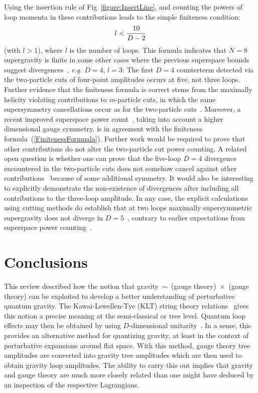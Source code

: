 \documentclass[12pt]{livrev}
\begin{document}
Using the insertion rule of Fig~\ref{figure:InsertLine}, 
and counting the powers of loop momenta in these contributions 
leads to the simple finiteness condition:
%
\begin{equation}
l < {10 \over D-2}
\label{FinitenessFormuala}
\end{equation}
%
(with $l>1$), where $l$ is the number of loops.  This formula
indicates that $N=8$ supergravity is finite in some other cases where
the previous superspace bounds suggest divergences~\cite{Howe89}, {\it
e.g.} $D=4$, $l=3$: The first $D=4$ counterterm detected via the
two-particle cuts of four-point amplitudes occurs at five, not three
loops.  Further evidence that the finiteness formula is correct stems
from the maximally helicity violating contributions to $m$-particle
cuts, in which the same supersymmetry cancellations occur as for the
two-particle cuts~\cite{BDDPR}.  Moreover, a recent improved
superspace power count~\cite{Stelle}, taking into account a higher
dimensional gauge symmetry, is in agreement with the finiteness
formula~(\ref{FinitenessFormuala}).  Further work would be required to
prove that other contributions do not alter the two-particle cut power
counting.  A related open question is whether one can prove that the
five-loop $D=4$ divergence encountered in the two-particle cuts does not
somehow cancel against other contributions~\cite{ChalmersN8} because
of some additional symmetry.  It would also be interesting to
explicitly demonstrate the non-existence of divergences after
including all contributions to the three-loop amplitude.  In any case,
the explicit calculations using cutting methods do establish that at
two loops maximally supersymmetric supergravity does not diverge in
$D=5$~\cite{BDDPR}, contrary to earlier expectations from superspace
power counting~\cite{Howe89}.

\newpage

\section{Conclusions}
\label{section:conclusions}

This review described how the notion that gravity~$\sim$~(gauge
theory)~$\times$~(gauge theory) can be exploited to develop a better
understanding of perturbative quantum gravity.  The Kawai-Lewellen-Tye
(KLT) string theory relations~\cite{KLT} gives this notion a precise meaning 
at the semi-classical or tree level.  Quantum loop effects
may then be obtained by using $D$-dimensional
unitarity~\cite{Bern94SusyFour,Bern95SusyFour,BernMorgan,Review}.  In
a sense, this provides an alternative method for quantizing gravity,
at least in the context of perturbative expansions around flat space.
With this method, gauge theory tree amplitudes are converted into
gravity tree amplitudes which are then used to obtain gravity loop
amplitudes.  The ability to carry this out implies that gravity and
gauge theory are much more closely related than one might have deduced
by an inspection of the respective Lagrangians.
\end{document}
